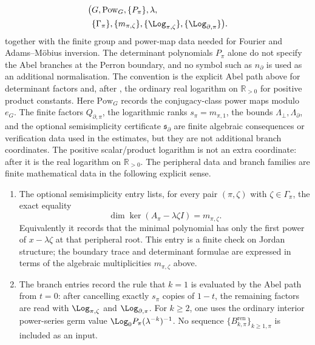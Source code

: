 \begin{proposition}
\begin{equation}
\begin{aligned}
    \bigl(&G,\operatorname{Pow}_G,\{P_\pi\},\lambda,\\
      &\{\Gamma_\pi\},\{m_{\pi,\zeta}\},
        \{\Log_{\pi,\zeta}\},\{\Log_{\partial,\pi}\}\bigr).
    \end{aligned}
  \end{equation}
  together with the finite group and power-map data needed for Fourier and
  Adams--M\"obius inversion.  The determinant polynomials \(P_\pi\) alone do
  not specify the Abel branches at the Perron boundary, and no symbol such as
  \(n_\partial\) is used as an additional normalisation.  The convention is the
  explicit Abel path above for determinant factors and, after
  , the ordinary real logarithm on
  \(\mathbb R_{>0}\) for positive product constants.
  Here \(\mathrm{Pow}_G\) records the conjugacy-class power maps modulo
  \(e_G\).  The finite factors \(Q_{\partial,\pi}\), the logarithmic ranks
  \(s_\pi=m_{\pi,1}\), the bounds \(\Lambda_\perp,\Lambda_\partial\), and the
  optional semisimplicity certificate \(\mathfrak s_\partial\) are finite
  algebraic consequences or verification data used in the estimates, but they
  are not additional branch coordinates.  The positive scalar/product
  logarithm is not an extra coordinate: after
   it is the real logarithm on
  \(\mathbb R_{>0}\).  The peripheral data and branch families are finite
  mathematical data in the following explicit sense.
  \begin{enumerate}[label=\textup{(\roman*)},leftmargin=*]
    \item The optional semisimplicity entry lists, for every pair
    \((\pi,\zeta)\) with \(\zeta\in\Gamma_\pi\), the exact equality
    \[
      \dim\ker(A_\pi-\lambda\zeta I)=m_{\pi,\zeta}.
    \]
    Equivalently it records that the minimal polynomial has only the first
    power of \(x-\lambda\zeta\) at that peripheral root.  This entry is a
    finite check on Jordan structure; the boundary trace and determinant
    formulae are expressed in terms of the algebraic multiplicities
    \(m_{\pi,\zeta}\) above.
    \item The branch entries record the rule that \(k=1\) is evaluated by the
    Abel path from \(t=0\): after cancelling exactly \(s_\pi\) copies of
    \(1-t\), the remaining factors are read with
    \(\Log_{\pi,\zeta}\) and \(\Log_{\partial,\pi}\).  For \(k\ge2\), one uses
    the ordinary interior power-series germ value
    \(\Log_0 P_\pi(\lambda^{-k})^{-1}\).  No sequence
    \(\{B_{k,\pi}^{\mathrm{ren}}\}_{k\ge1,\pi}\) is included as an input.

\end{enumerate}
\end{proposition}
